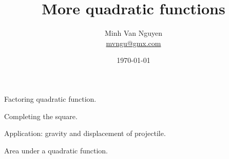 \documentclass[a4paper,oneside,12pt]{article}
\begin{document}
\title{\Large\bf More quadratic functions}
\author{%
  Minh Van Nguyen \\
  \url{mvngu@gmx.com}
}
\date{\today}
\maketitle


\begin{packeditem}
\item Factoring quadratic function.

\item Completing the square.

\item Application: gravity and displacement of projectile.

\item Area under a quadratic function.
\end{packeditem}
\end{document}
